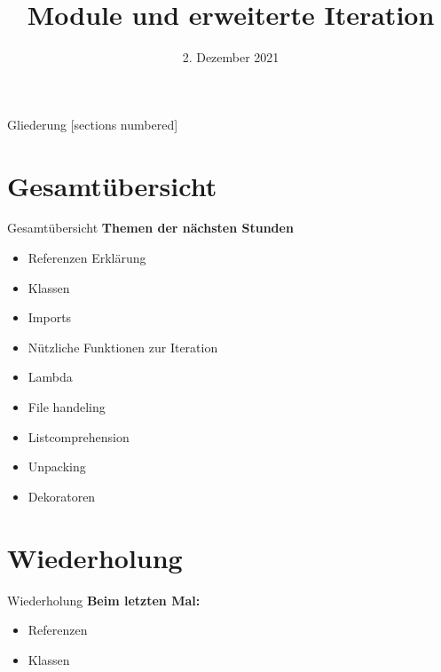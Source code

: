 



\title{Module und erweiterte Iteration}
\date{2. Dezember 2021}


	
\maketitle

\begin{frame}{Gliederung}
	[sections numbered]
	\tableofcontents
\end{frame}

\section*{Gesamtübersicht}
\begin{frame}{Gesamtübersicht}
	\textbf{Themen der nächsten Stunden}
	\begin{itemize}
		\item Referenzen Erklärung
		\item  Klassen
		\item \alert{Imports}
		\item \alert{Nützliche Funktionen zur Iteration}
		\item Lambda
		\item File handeling
		\item Listcomprehension
		\item Unpacking
		\item Dekoratoren
	\end{itemize}
\end{frame}

\section{Wiederholung}
\begin{frame}{Wiederholung}
	\textbf{Beim letzten Mal:}
	\centering\begin{itemize}
		\item Referenzen
		\item Klassen 
		
	\end{itemize}

		
\end{frame}

